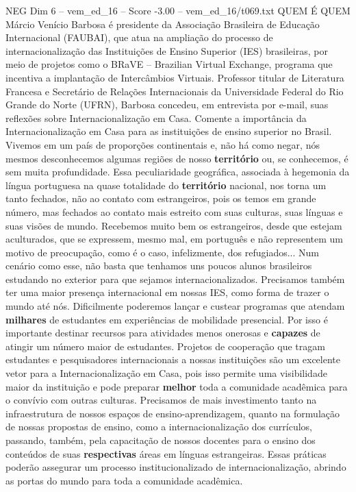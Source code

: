 \begin{textsample}{NEG Dim 6 – vem\_ed\_16 – Score -3.00 – vem\_ed\_16/t069.txt}  \label{ex:f6_neg_016}
QUEM É QUEM Márcio Venício Barbosa é presidente da Associação Brasileira de Educação Internacional (FAUBAI), que atua na ampliação do processo de internacionalização das Instituições de Ensino Superior (IES) brasileiras, por meio de projetos como o BRaVE – Brazilian Virtual Exchange, programa que incentiva a implantação de Intercâmbios Virtuais.
Professor titular de Literatura Francesa e Secretário de Relações Internacionais da Universidade Federal do Rio Grande do Norte (UFRN), Barbosa concedeu, em entrevista por e-mail, suas reflexões sobre Internacionalização em Casa.
Comente a importância da Internacionalização em Casa para as instituições de ensino superior no Brasil.
Vivemos em um país de proporções continentais e, não há como negar, nós mesmos desconhecemos algumas regiões de nosso \textbf{território} ou, se conhecemos, é sem muita profundidade.
Essa peculiaridade geográfica, associada à hegemonia da língua portuguesa na quase totalidade do \textbf{território} nacional, nos torna um tanto fechados, não ao contato com estrangeiros, pois os temos em grande número, mas fechados ao contato mais estreito com suas culturas, suas línguas e suas visões de mundo.
Recebemos muito bem os estrangeiros, desde que estejam aculturados, que se expressem, mesmo mal, em português e não representem um motivo de preocupação, como é o caso, infelizmente, dos refugiados...
Num cenário como esse, não basta que tenhamos uns poucos alunos brasileiros estudando no exterior para que sejamos internacionalizados.
Precisamos também ter uma maior presença internacional em nossas IES, como forma de trazer o mundo até nós.
Dificilmente poderemos lançar e custear programas que atendam \textbf{milhares} de estudantes em experiências de mobilidade presencial.
Por isso é importante destinar recursos para atividades menos onerosas e \textbf{capazes} de atingir um número maior de estudantes.
Projetos de cooperação que tragam estudantes e pesquisadores internacionais a nossas instituições são um excelente vetor para a Internacionalização em Casa, pois isso permite uma visibilidade maior da instituição e pode preparar \textbf{melhor} toda a comunidade acadêmica para o convívio com outras culturas.
Precisamos de mais investimento tanto na infraestrutura de nossos espaços de ensino-aprendizagem, quanto na formulação de nossas propostas de ensino, como a internacionalização dos currículos, passando, também, pela capacitação de nossos docentes para o ensino dos conteúdos de suas \textbf{respectivas} áreas em línguas estrangeiras.
Essas práticas poderão assegurar um processo institucionalizado de internacionalização, abrindo as portas do mundo para toda a comunidade acadêmica.

\end{textsample}
